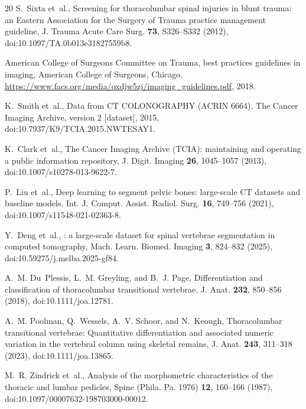 \documentclass[aapm,mph,amsmath,amssymb,preprint,linenumbers]{revtex4-2}
\begin{document}
\begin{thebibliography}{20}
S.~Sixta et~al.,
\newblock Screening for thoracolumbar spinal injuries in blunt trauma: an {Eastern Association for the Surgery of Trauma} practice management guideline,
\newblock J. Trauma Acute Care Surg. {\bf 73}, S326--S332 (2012),
\newblock doi:10.1097/TA.0b013e31827559b8.

{American College of Surgeons Committee on Trauma},
 best practices guidelines in imaging,
\newblock American College of Surgeons, Chicago. \url{https://www.facs.org/media/oxdjw5zj/imaging_guidelines.pdf}, 2018.

K.~Smith et~al.,
\newblock Data from {CT COLONOGRAPHY} ({ACRIN} 6664),
\newblock The Cancer Imaging Archive, version 2 [dataset], 2015,
\newblock doi:10.7937/K9/TCIA.2015.NWTESAY1.

K.~Clark et~al.,
\newblock The {Cancer Imaging Archive} ({TCIA}): maintaining and operating a public information repository,
\newblock J. Digit. Imaging {\bf 26}, 1045--1057 (2013),
\newblock doi:10.1007/s10278-013-9622-7.

P.~Liu et~al.,
\newblock Deep learning to segment pelvic bones: large-scale {CT} datasets and baseline models,
\newblock Int. J. Comput. Assist. Radiol. Surg. {\bf 16}, 749--756 (2021),
\newblock doi:10.1007/s11548-021-02363-8.

Y.~Deng et~al.,
: a large-scale dataset for spinal vertebrae segmentation in computed tomography,
\newblock Mach. Learn. Biomed. Imaging {\bf 3}, 824--832 (2025),
\newblock doi:10.59275/j.melba.2025-gf84.

A.~M. Du~Plessis, L.~M. Greyling, and B.~J. Page,
\newblock Differentiation and classification of thoracolumbar transitional vertebrae,
\newblock J. Anat. {\bf 232}, 850--856 (2018),
\newblock doi:10.1111/joa.12781.

A.~M. Poolman, Q.~Wessels, A.~V. Schoor, and N.~Keough,
\newblock Thoracolumbar transitional vertebrae: Quantitative differentiation and associated numeric variation in the vertebral column using skeletal remains,
\newblock J. Anat. {\bf 243}, 311--318 (2023),
\newblock doi:10.1111/joa.13865.

M.~R. Zindrick et~al.,
\newblock Analysis of the morphometric characteristics of the thoracic and lumbar pedicles,
\newblock Spine (Phila. Pa. 1976) {\bf 12}, 160--166 (1987),
\newblock doi:10.1097/00007632-198703000-00012.


\end{thebibliography}
\end{document}
